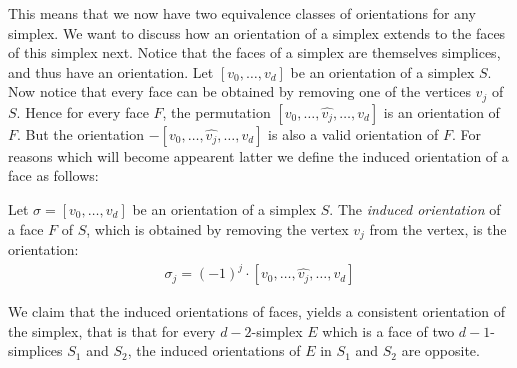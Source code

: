 This means that we now have two equivalence classes of orientations for any simplex. We want to discuss how an orientation of a simplex extends to the faces of this simplex next. Notice that the faces of a simplex are themselves simplices, and thus have an orientation. Let $[v_0, \dots, v_{d}]$ be an orientation of a simplex $S$. Now notice that every face can be obtained by removing one of the vertices $v_j$ of $S$. Hence for every face $F$, the permutation $[v_0, \dots, \hat{v_j}, \dots, v_{d}]$ is an orientation of $F$. But the orientation $- [v_0, \dots, \hat{v_j}, \dots, v_{d}]$ is also a valid orientation of $F$. For reasons which will become appearent latter we define the induced orientation of a face as follows:

\begin{definition}
    Let $\sigma = [v_0, \dots, v_{d}]$ be an orientation of a simplex $S$. The \emph{induced orientation} of a face $F$ of $S$, which is obtained by removing the vertex $v_j$ from the vertex, is the orientation:
    \begin{align*}
        \sigma_j = (-1)^j \cdot [v_0, \dots, \hat{v_j}, \dots, v_{d}]
    \end{align*}
\end{definition}

We claim that the induced orientations of faces, yields a consistent orientation of the simplex, that is that for every $d-2$-simplex $E$ which is a face of two $d-1$-simplices $S_1$ and $S_2$, the induced orientations of $E$ in $S_1$ and $S_2$ are opposite.

